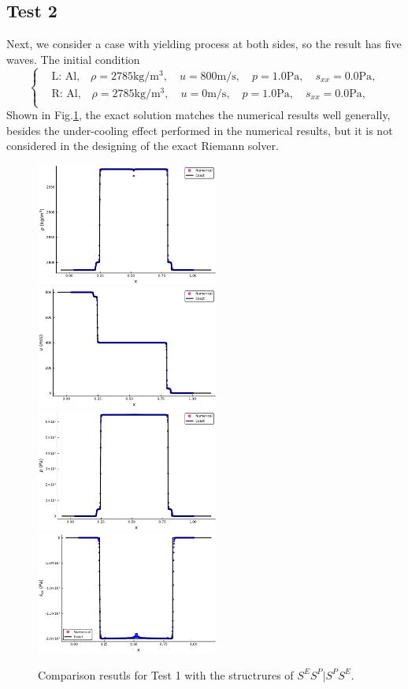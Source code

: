 \documentclass[review]{elsarticle}
\begin{document}
\begin{enumerate}[Step 1]
\subsection{Test 2}
Next, we consider a case with yielding process at both sides, so the result has five waves. The initial condition 
\begin{equation}
 \left\{ \begin{aligned}
	 &	 \text{L: Al,}\quad  \rho = 2785 \text{kg}/\text{m}^3, \quad  u = 800\text{m}/\text{s}, \quad  p = 1.0\text{Pa}, \quad  s_{xx}=0.0 \text{Pa},\\
&	 \text{R: Al,}\quad  \rho = 2785 \text{kg}/\text{m}^3, \quad  u = 0\text{m}/\text{s}, \quad  p = 1.0\text{Pa}, \quad  s_{xx}=0.0 \text{Pa},\\
   \end{aligned}
 \right.
\end{equation}
Shown in Fig.\ref{fig:case2}, the exact solution matches the numerical results well generally, besides the under-cooling effect performed in the numerical results, but it is not considered in the designing of the exact Riemann solver. 
\begin{figure}
  \centering
\includegraphics[width= 6cm] {case2rho.pdf}
  \includegraphics[width= 6cm] {case2u.pdf}
  \includegraphics[width= 6cm] {case2p.pdf}
  \includegraphics[width= 6cm] {case2sxx.pdf}
  \caption{Comparison resutls for Test 1 with the structrures of $S^ES^P|S^PS^E$.  }
  \label{fig:case2}
\end{figure}


\end{enumerate}
\end{document}
